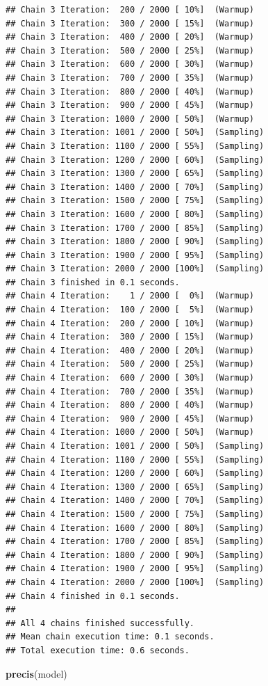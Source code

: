 \documentclass[
]{book}
\newenvironment{Shaded}{\begin{snugshade}}{\end{snugshade}}
\newcommand{\FunctionTok}[1]{\textcolor[rgb]{0.13,0.29,0.53}{\textbf{#1}}}
\newcommand{\NormalTok}[1]{#1}
\begin{document}
\begin{verbatim}
## Chain 3 Iteration:  200 / 2000 [ 10%]  (Warmup) 
## Chain 3 Iteration:  300 / 2000 [ 15%]  (Warmup) 
## Chain 3 Iteration:  400 / 2000 [ 20%]  (Warmup) 
## Chain 3 Iteration:  500 / 2000 [ 25%]  (Warmup) 
## Chain 3 Iteration:  600 / 2000 [ 30%]  (Warmup) 
## Chain 3 Iteration:  700 / 2000 [ 35%]  (Warmup) 
## Chain 3 Iteration:  800 / 2000 [ 40%]  (Warmup) 
## Chain 3 Iteration:  900 / 2000 [ 45%]  (Warmup) 
## Chain 3 Iteration: 1000 / 2000 [ 50%]  (Warmup) 
## Chain 3 Iteration: 1001 / 2000 [ 50%]  (Sampling) 
## Chain 3 Iteration: 1100 / 2000 [ 55%]  (Sampling) 
## Chain 3 Iteration: 1200 / 2000 [ 60%]  (Sampling) 
## Chain 3 Iteration: 1300 / 2000 [ 65%]  (Sampling) 
## Chain 3 Iteration: 1400 / 2000 [ 70%]  (Sampling) 
## Chain 3 Iteration: 1500 / 2000 [ 75%]  (Sampling) 
## Chain 3 Iteration: 1600 / 2000 [ 80%]  (Sampling) 
## Chain 3 Iteration: 1700 / 2000 [ 85%]  (Sampling) 
## Chain 3 Iteration: 1800 / 2000 [ 90%]  (Sampling) 
## Chain 3 Iteration: 1900 / 2000 [ 95%]  (Sampling) 
## Chain 3 Iteration: 2000 / 2000 [100%]  (Sampling) 
## Chain 3 finished in 0.1 seconds.
## Chain 4 Iteration:    1 / 2000 [  0%]  (Warmup) 
## Chain 4 Iteration:  100 / 2000 [  5%]  (Warmup) 
## Chain 4 Iteration:  200 / 2000 [ 10%]  (Warmup) 
## Chain 4 Iteration:  300 / 2000 [ 15%]  (Warmup) 
## Chain 4 Iteration:  400 / 2000 [ 20%]  (Warmup) 
## Chain 4 Iteration:  500 / 2000 [ 25%]  (Warmup) 
## Chain 4 Iteration:  600 / 2000 [ 30%]  (Warmup) 
## Chain 4 Iteration:  700 / 2000 [ 35%]  (Warmup) 
## Chain 4 Iteration:  800 / 2000 [ 40%]  (Warmup) 
## Chain 4 Iteration:  900 / 2000 [ 45%]  (Warmup) 
## Chain 4 Iteration: 1000 / 2000 [ 50%]  (Warmup) 
## Chain 4 Iteration: 1001 / 2000 [ 50%]  (Sampling) 
## Chain 4 Iteration: 1100 / 2000 [ 55%]  (Sampling) 
## Chain 4 Iteration: 1200 / 2000 [ 60%]  (Sampling) 
## Chain 4 Iteration: 1300 / 2000 [ 65%]  (Sampling) 
## Chain 4 Iteration: 1400 / 2000 [ 70%]  (Sampling) 
## Chain 4 Iteration: 1500 / 2000 [ 75%]  (Sampling) 
## Chain 4 Iteration: 1600 / 2000 [ 80%]  (Sampling) 
## Chain 4 Iteration: 1700 / 2000 [ 85%]  (Sampling) 
## Chain 4 Iteration: 1800 / 2000 [ 90%]  (Sampling) 
## Chain 4 Iteration: 1900 / 2000 [ 95%]  (Sampling) 
## Chain 4 Iteration: 2000 / 2000 [100%]  (Sampling) 
## Chain 4 finished in 0.1 seconds.
## 
## All 4 chains finished successfully.
## Mean chain execution time: 0.1 seconds.
## Total execution time: 0.6 seconds.
\end{verbatim}

\begin{Shaded}
\begin{Highlighting}[]
\FunctionTok{precis}\NormalTok{(model)}
\end{Highlighting}
\end{Shaded}
\end{document}
